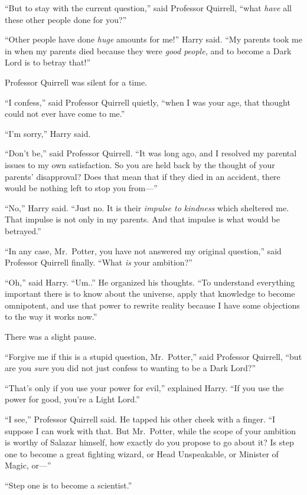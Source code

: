 ``But to stay with the current question,'' said Professor Quirrell,
``what \emph{have} all these other people done for you?''

``Other people have done \emph{huge} amounts for me!'' Harry said. ``My
parents took me in when my parents died because they were \emph{good
people,} and to become a Dark Lord is to betray that!''

Professor Quirrell was silent for a time.

``I confess,'' said Professor Quirrell quietly, ``when I was your age,
that thought could not ever have come to me.''

``I'm sorry,'' Harry said.

``Don't be,'' said Professor Quirrell. ``It was long ago, and I resolved
my parental issues to my own satisfaction. So you are held back by the
thought of your parents' disapproval? Does that mean that if they died
in an accident, there would be nothing left to stop you from---''

``No,'' Harry said. ``Just no. It is their \emph{impulse to kindness}
which sheltered me. That impulse is not only in my parents. And that
impulse is what would be betrayed.''

``In any case, Mr.~Potter, you have not answered my original question,''
said Professor Quirrell finally. ``What \emph{is} your ambition?''

``Oh,'' said Harry. ``Um..'' He organized his thoughts. ``To understand
everything important there is to know about the universe, apply that
knowledge to become omnipotent, and use that power to rewrite reality
because I have some objections to the way it works now.''

There was a slight pause.

``Forgive me if this is a stupid question, Mr.~Potter,'' said Professor
Quirrell, ``but are you \emph{sure} you did not just confess to wanting
to be a Dark Lord?''

``That's only if you use your power for evil,'' explained Harry. ``If
you use the power for good, you're a Light Lord.''

``I see,'' Professor Quirrell said. He tapped his other cheek with a
finger. ``I suppose I can work with that. But Mr.~Potter, while the
scope of your ambition is worthy of Salazar himself, how exactly do you
propose to go about it? Is step one to become a great fighting wizard,
or Head Unspeakable, or Minister of Magic, or---''

``Step one is to become a scientist.''

